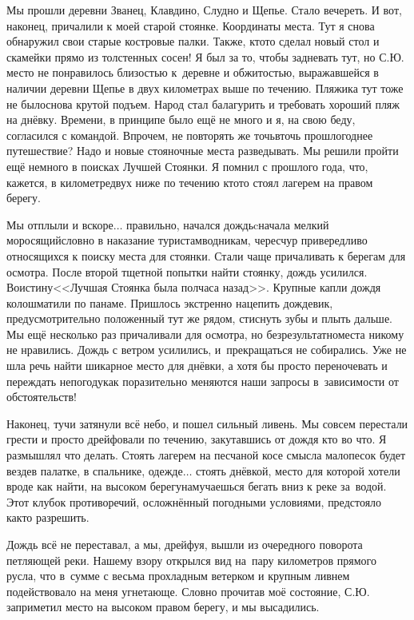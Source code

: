 Мы прошли деревни Званец, Клавдино, Слудно и Щепье. Стало вечереть. И вот, наконец, причалили к моей старой стоянке. Координаты места\mdash \CoordsChagodoschaFifteenSecondDnevka. Тут я снова обнаружил свои старые костровые палки. Также, кто\sdash то сделал новый стол и скамейки прямо из толстенных сосен! Я был за то, чтобы задневать тут, но С.Ю. место не понравилось близостью к~деревне и обжитостью, выражавшейся в наличии деревни Щепье в двух километрах выше по течению. Пляжика тут тоже не было\mdash снова крутой подъем. Народ стал балагурить и требовать хороший пляж на днёвку. Времени, в принципе было ещё не много и я, на свою беду, согласился с командой. Впрочем, не повторять же точь\sdash в\sdash точь прошлогоднее путешествие? Надо и новые стояночные места разведывать. Мы решили пройти ещё немного в поисках Лучшей Стоянки. Я помнил с прошлого года, что, кажется, в километре\sdash двух ниже по течению кто\sdash то стоял лагерем на правом берегу.

\newpage
Мы отплыли и вскоре$\ldots$ правильно, начался дождь\mdash cначала мелкий моросящий\mdash словно в наказание туристам\sdash водникам, чересчур привередливо относящихся к поиску места для стоянки. Стали чаще причаливать к берегам для осмотра. После второй тщетной попытки найти стоянку, дождь усилился. Воистину\mdash <<Лучшая Стоянка была полчаса назад>>. Крупные капли дождя колошматили по панаме. Пришлось экстренно нацепить дождевик, предусмотрительно положенный тут же рядом, стиснуть зубы и плыть дальше. Мы ещё несколько раз причаливали для осмотра, но безрезультатно\mdash места никому не нравились. Дождь с ветром усилились, и~прекращаться не собирались. Уже не шла речь найти шикарное место для днёвки, а хотя бы просто переночевать и переждать непогоду\mdash как поразительно меняются наши запросы в~зависимости от обстоятельств!

Наконец, тучи затянули всё небо, и пошел сильный ливень. Мы совсем перестали грести и просто дрейфовали по течению, закутавшись от дождя кто во что. Я размышлял что делать. Стоять лагерем на песчаной косе смысла мало\mdash песок будет везде\mdash в палатке, в спальнике, одежде$\ldots$ стоять днёвкой, место для которой хотели вроде как найти, на высоком берегу\mdash намучаешься бегать вниз к реке за~водой. Этот клубок противоречий, осложнённый погодными условиями, предстояло как\sdash то разрешить. 

Дождь всё не переставал, а мы, дрейфуя, вышли из очередного поворота петляющей реки. Нашему взору открылся вид на~пару километров прямого русла, что в~сумме с весьма прохладным ветерком и крупным ливнем подействовало на меня угнетающе. Словно прочитав моё состояние, С.Ю. заприметил место на высоком правом берегу, и мы высадились. 

